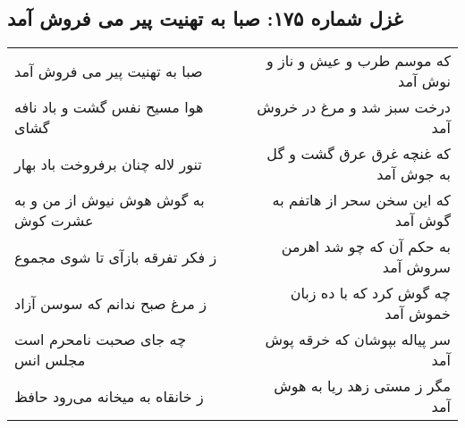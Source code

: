 \begin{center}
\section*{غزل شماره ۱۷۵: صبا به تهنیت پیر می فروش آمد}
\label{sec:sh175}
\begin{longtable}{l p{0.5cm} r}
صبا به تهنیت پیر می فروش آمد
&&
که موسم طرب و عیش و ناز و نوش آمد
\\
هوا مسیح نفس گشت و باد نافه گشای
&&
درخت سبز شد و مرغ در خروش آمد
\\
تنور لاله چنان برفروخت باد بهار
&&
که غنچه غرق عرق گشت و گل به جوش آمد
\\
به گوش هوش نیوش از من و به عشرت کوش
&&
که این سخن سحر از هاتفم به گوش آمد
\\
ز فکر تفرقه بازآی تا شوی مجموع
&&
به حکم آن که چو شد اهرمن سروش آمد
\\
ز مرغ صبح ندانم که سوسن آزاد
&&
چه گوش کرد که با ده زبان خموش آمد
\\
چه جای صحبت نامحرم است مجلس انس
&&
سر پیاله بپوشان که خرقه پوش آمد
\\
ز خانقاه به میخانه می‌رود حافظ
&&
مگر ز مستی زهد ریا به هوش آمد
\\
\end{longtable}
\end{center}
